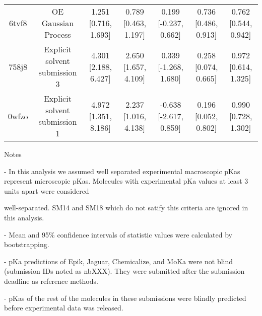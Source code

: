 \documentclass{article}
\begin{document}
\begin{center}
\begin{longtable}{|ccccccc|}
 6tvf8 &                                OE Gaussian Process &  1.251 [0.716, 1.693] &  0.789 [0.463, 1.197] &   0.199 [-0.237, 0.662] &  0.736 [0.486, 0.913] &  0.762 [0.544, 0.942] \\
 758j8 &                      Explicit solvent submission 3 &  4.301 [2.188, 6.427] &  2.650 [1.657, 4.109] &   0.339 [-1.268, 1.680] &  0.258 [0.074, 0.665] &  0.972 [0.614, 1.325] \\
 0wfzo &                      Explicit solvent submission 1 &  4.972 [1.351, 8.186] &  2.237 [1.016, 4.138] &  -0.638 [-2.617, 0.859] &  0.196 [0.052, 0.802] &  0.990 [0.728, 1.302] \\
\end{longtable}
\end{center}

Notes

- In this analysis we assumed well separated experimental macroscopic pKas represent microscopic pKas. Molecules with experimental pKa values at least 3 units apart were considered

well-separated. SM14 and SM18 which do not satify this criteria are ignored in this analysis.

- Mean and 95\% confidence intervals of statistic values were calculated by bootstrapping.

- pKa predictions of Epik, Jaguar, Chemicalize, and MoKa were not blind (submission IDs noted as nbXXX). They were submitted after the submission deadline as reference methods.

- pKas of the rest of the molecules in these submissions were blindly predicted before experimental data was released.
\end{document}
